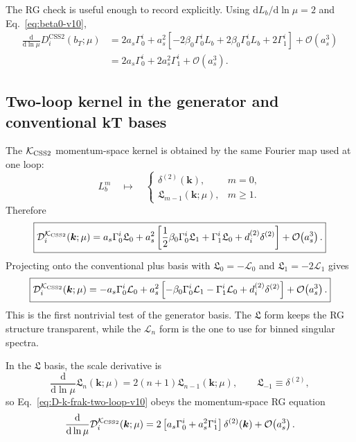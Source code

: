 \documentclass[11pt]{article}
\newcommand{\bk}{\bm{k}}
\newcommand{\dd}{\mathrm{d}}
\newcommand{\deltaT}{\delta^{(2)}}
\newcommand{\order}[1]{\mathcal{O}\!\left(#1\right)}
\newcommand{\KCSS}{\mathcal K_{\rm CSS2}}
\newcommand{\CSS}{\mathrm{CSS2}}
\begin{document}
The RG check is useful enough to record explicitly.  Using
$\dd L_b/\dd\ln\mu=2$ and Eq.~\eqref{eq:beta0-v10},
\begin{align}
  \frac{\dd}{\dd\ln\mu}D_i^{\CSS}(b_T;\mu)
  &
  =2a_s\Gamma_0^i
   +a_s^2\left[-2\beta_0\Gamma_0^iL_b
   +2\beta_0\Gamma_0^iL_b+2\Gamma_1^i\right]
   +\order{a_s^3}
  \\
  &=2a_s\Gamma_0^i+2a_s^2\Gamma_1^i+\order{a_s^3}.
  \label{eq:D-two-loop-rg-check-v10}
\end{align}

\subsection{Two-loop kernel in the generator and conventional kT bases}

The $\KCSS$ momentum-space kernel is obtained by the same Fourier map used at one loop:
\begin{equation}
  L_b^m\quad\longmapsto\quad
  \begin{cases}
    \deltaT(\bk), & m=0,\\
    \mathfrak L_{m-1}(\bk;\mu), & m\ge 1.
  \end{cases}
  \label{eq:Lb-power-map-v10}
\end{equation}
Therefore
\begin{equation}
  \boxed{
  \mathcal D_i^{\KCSS}(\bk;\mu)
  =a_s\Gamma_0^i\mathfrak L_0
  +a_s^2\left[
      \frac{1}{2}\beta_0\Gamma_0^i\mathfrak L_1
      +\Gamma_1^i\mathfrak L_0
      +d_i^{(2)}\deltaT
    \right]
  +\order{a_s^3}.}
  \label{eq:D-k-frak-two-loop-v10}
\end{equation}
Projecting onto the conventional plus basis with
$\mathfrak L_0=-\mathcal L_0$ and $\mathfrak L_1=-2\mathcal L_1$ gives
\begin{equation}
  \boxed{
  \mathcal D_i^{\KCSS}(\bk;\mu)
  =-a_s\Gamma_0^i\mathcal L_0
  +a_s^2\left[
      -\beta_0\Gamma_0^i\mathcal L_1
      -\Gamma_1^i\mathcal L_0
      +d_i^{(2)}\deltaT
    \right]
  +\order{a_s^3}.}
  \label{eq:D-k-L-two-loop-v10}
\end{equation}
This is the first nontrivial test of the generator basis.  The $\mathfrak L$ form keeps
the RG structure transparent, while the $\mathcal L_n$ form is the one to use for binned
singular spectra.

In the $\mathfrak L$ basis, the scale derivative is
\begin{equation}
  \frac{\dd}{\dd\ln\mu}\mathfrak L_n(\bk;\mu)
  =2(n+1)\mathfrak L_{n-1}(\bk;\mu),
  \qquad
  \mathfrak L_{-1}\equiv\deltaT,
  \label{eq:frak-scale-derivative-v10}
\end{equation}
so Eq.~\eqref{eq:D-k-frak-two-loop-v10} obeys the momentum-space RG equation
\begin{equation}
  \frac{\dd}{\dd\ln\mu}\mathcal D_i^{\KCSS}(\bk;\mu)
  =2\left[a_s\Gamma_0^i+a_s^2\Gamma_1^i\right]\deltaT(\bk)
  +\order{a_s^3}.
  \label{eq:D-k-two-loop-rg-v10}
\end{equation}
\end{document}
